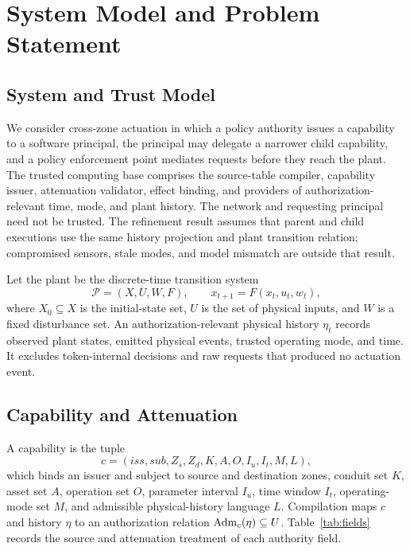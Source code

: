 \section{System Model and Problem Statement}
\label{sec:model}

\subsection{System and Trust Model}

We consider cross-zone actuation in which a policy authority issues a capability to a software principal, the principal may delegate a narrower child capability, and a policy enforcement point mediates requests before they reach the plant. The trusted computing base comprises the source-table compiler, capability issuer, attenuation validator, effect binding, and providers of authorization-relevant time, mode, and plant history. The network and requesting principal need not be trusted. The refinement result assumes that parent and child executions use the same history projection and plant transition relation; compromised sensors, stale modes, and model mismatch are outside that result.

Let the plant be the discrete-time transition system
\begin{equation}
    \mathcal{P}=(X,U,W,F), \qquad x_{t+1}=F(x_t,u_t,w_t),
    \label{eq:plant}
\end{equation}
where $X_0\subseteq X$ is the initial-state set, $U$ is the set of physical inputs, and $W$ is a fixed disturbance set. An authorization-relevant physical history $\eta_t$ records observed plant states, emitted physical events, trusted operating mode, and time. It excludes token-internal decisions and raw requests that produced no actuation event.

\subsection{Capability and Attenuation}

A \zonecap{} capability is the tuple
\begin{equation}
 c=(\mathit{iss},\mathit{sub},Z_s,Z_d,K,A,O,I_u,I_t,M,L),
 \label{eq:capability}
\end{equation}
which binds an issuer and subject to source and destination zones, conduit set $K$, asset set $A$, operation set $O$, parameter interval $I_u$, time window $I_t$, operating-mode set $M$, and admissible physical-history language $L$. Compilation maps $c$ and history $\eta$ to an authorization relation $\operatorname{Adm}_c(\eta)\subseteq U$. Table~\ref{tab:fields} records the source and attenuation treatment of each authority field.

